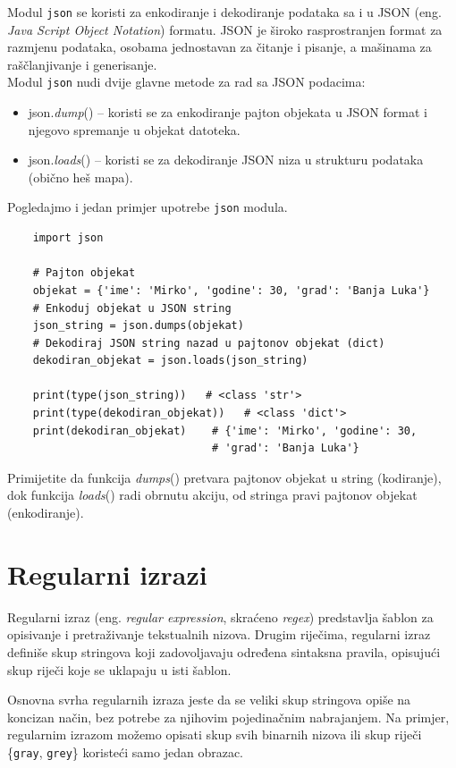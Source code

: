 Modul \texttt{json} se koristi  za enkodiranje i dekodiranje podataka sa i u JSON (eng. \textit{Java Script Object Notation}) formatu. JSON je  široko raspro\-stranjen format za razmjenu podataka, osobama  jednostavan za čitanje i pisanje, a mašinama za raščlanjivanje i generisanje.\\

Modul \texttt{json} nudi dvije glavne metode za rad sa JSON podacima:


\begin{itemize}
	\item json.\textit{dump}() -- koristi se za enkodiranje pajton objekata u JSON format i njegovo spremanje u objekat  datoteka.
	\item json.\textit{loads}() -- koristi se za dekodiranje JSON niza u strukturu podataka (obično heš mapa).
\end{itemize}

Pogledajmo i jedan primjer upotrebe \texttt{json} modula. 

\begin{verbatim}
	import json
	
	# Pajton objekat
	objekat = {'ime': 'Mirko', 'godine': 30, 'grad': 'Banja Luka'}
	# Enkoduj objekat u JSON string
	json_string = json.dumps(objekat)
	# Dekodiraj JSON string nazad u pajtonov objekat (dict)
	dekodiran_objekat = json.loads(json_string)
	
	print(type(json_string))   # <class 'str'>
	print(type(dekodiran_objekat))   # <class 'dict'>
	print(dekodiran_objekat)    # {'ime': 'Mirko', 'godine': 30,
		                        # 'grad': 'Banja Luka'}
\end{verbatim}


Primijetite da funkcija \textit{dumps}() pretvara pajtonov objekat u string (kodiranje), dok funkcija \textit{loads}() radi obrnutu akciju, od stringa pravi pajtonov objekat (enkodiranje). 

\section{Regularni izrazi}

Regularni izraz (eng. \textit{regular expression}, skraćeno \textit{regex}) predstavlja šablon za opisivanje i pretraživanje tekstualnih nizova. Drugim riječima, regularni izraz definiše skup stringova koji zadovoljavaju određena sintaksna pravila, opisujući skup riječi koje se uklapaju u isti šablon. 

Osnovna svrha regularnih izraza jeste da se veliki skup stringova opiše na koncizan način, bez potrebe za njihovim pojedinačnim nabrajanjem. Na primjer, regularnim izrazom možemo opisati skup svih binarnih nizova ili skup riječi \{\texttt{gray}, \texttt{grey}\} koristeći samo jedan obrazac.

